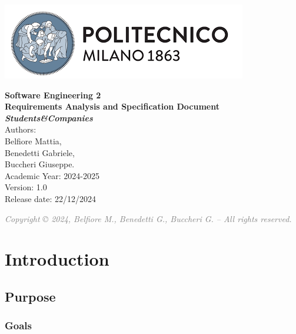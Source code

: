 \documentclass[11pt,twoside]{article}
\begin{document}
\begin{titlepage}
    \begin{center}
        \includegraphics[scale=0.5]{Images/PolimiLogo} \\[2cm]
    \end{center}
    
    \begin{center}
        {\color{RoyalBlue}\textbf{\Huge{Software Engineering 2 \\[1cm] Requirements Analysis and Specification Document \\[0.5cm] \textit{Students\&Companies}}}} \\[5cm]
        {\Large Authors: \\ Belfiore Mattia, \\  Benedetti Gabriele,\\ Buccheri Giuseppe.} \\[1cm]
        {\large Academic Year: 2024-2025} \\[0.5cm]
        {\large Version: 1.0} \\[0.5cm]
        {\large Release date: 22/12/2024} \\[2cm]
    \end{center}

    \vfill
    
    \begin{flushright}
        {\footnotesize \textcolor{Gray}{\emph{Copyright © 2024, Belfiore M., Benedetti G., Buccheri G. – All rights reserved.}}}
    \end{flushright}
\end{titlepage}

\clearpage
\tableofcontents
\newpage

\section{Introduction}
\subsection{Purpose}

\subsubsection{Goals}
\end{document}

